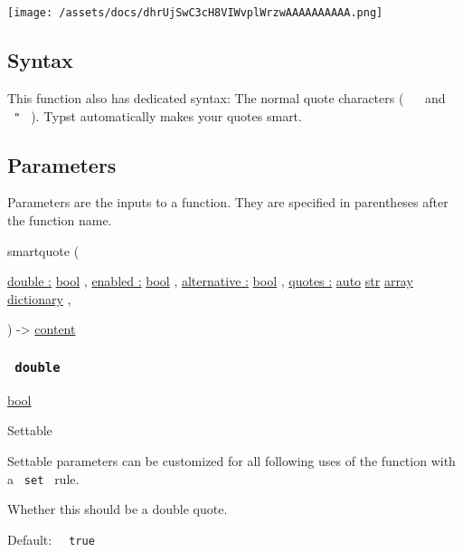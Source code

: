 \texttt{[image: /assets/docs/dhrUjSwC3cH8VIWvplWrzwAAAAAAAAAA.png]}

\subsection{Syntax}\label{syntax}

This function also has dedicated syntax: The normal quote characters (
\texttt{\ \textquotesingle{}\ } and \texttt{\ "\ } ). Typst
automatically makes your quotes smart.

\subsection{\texorpdfstring{{ Parameters
}}{ Parameters }}\label{parameters}

\label{parameters-tooltip}
Parameters are the inputs to a function. They are specified in
parentheses after the function name.

{ smartquote } (

{ \hyperref[parameters-double]{double :}
\href{/docs/reference/foundations/bool/}{bool} , } {
\hyperref[parameters-enabled]{enabled :}
\href{/docs/reference/foundations/bool/}{bool} , } {
\hyperref[parameters-alternative]{alternative :}
\href{/docs/reference/foundations/bool/}{bool} , } {
\hyperref[parameters-quotes]{quotes :}
\href{/docs/reference/foundations/auto/}{auto}
\href{/docs/reference/foundations/str/}{str}
\href{/docs/reference/foundations/array/}{array}
\href{/docs/reference/foundations/dictionary/}{dictionary} , }

) -\textgreater{} \href{/docs/reference/foundations/content/}{content}

\subsubsection{\texorpdfstring{\texttt{\ double\ }}{ double }}\label{parameters-double}

\href{/docs/reference/foundations/bool/}{bool}

{{ Settable }}

\label{parameters-double-settable-tooltip}
Settable parameters can be customized for all following uses of the
function with a \texttt{\ set\ } rule.

Whether this should be a double quote.

Default: \texttt{\ }{\texttt{\ true\ }}\texttt{\ }

